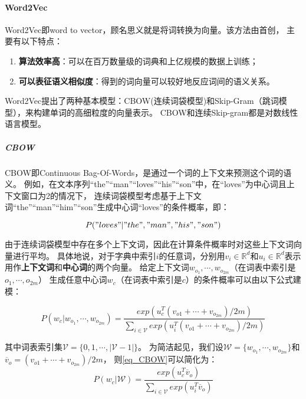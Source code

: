 \paragraph{Word2Vec}

Word2Vec即word to vector，顾名思义就是将词转换为向量。该方法由\parencite{mikolov2013efficient}首创，
主要有以下特点：
\begin{enumerate}
    \item \textbf{算法效率高}：可以在百万数量级的词典和上亿规模的数据上训练；
    \item \textbf{可以表征语义相似度}：得到的词向量可以较好地反应词间的语义关系。
\end{enumerate}

Word2Vec提出了两种基本模型：CBOW(连续词袋模型)和Skip-Gram（跳词模型），来构建单词的高细粒度的向量表示。
CBOW和连续Skip-gram都是对数线性语言模型。

\subparagraph{CBOW}
CBOW即Continuous Bag-Of-Words，是通过一个词的上下文来预测这个词的语义。
例如\parencite{zhang2021dive}，在文本序列“the”“man”“loves”“his”“son”中，在“loves”为中心词且上下文窗口为2的情况下，
连续词袋模型考虑基于上下文词“the”“man”“him”“son”生成中心词“loves”的条件概率，即：

\begin{equation}
    P("loves"|"the", "man", "his", "son")
\end{equation}

由于连续词袋模型中存在多个上下文词，因此在计算条件概率时对这些上下文词向量进行平均。
具体地说，对于字典中索引$i$的任意词，分别用$v_i \in \mathbb{R}^d$和$u_i \in \mathbb{R}^d$表示用作\textbf{上下文词}和\textbf{中心词}的两个向量。
给定上下文词$w_{o_1}, \cdots, w_{o_{2m}}$（在词表中索引是$o_1, \cdots, o_{2m}$）
生成任意中心词$w_c$（在词表中索引是$c$）的条件概率可以由以下公式建模：

\begin{equation}\label{eq_CBOW}
    P(w_c|w_{o_1}, \cdots, w_{o_{2m}})
    = \frac{exp \left(u^T_c(v_{o1} + \cdots + v_{o_{2m}}) / 2m \right)}
    {\sum_{i \in \mathcal{V}} exp \left( u^T_i(v_{o1} + \cdots + v_{o_{2m}}) / 2m \right)}
\end{equation}

其中词表索引集$\mathcal{V} = \{0, 1, \cdots, |\mathcal{V} - 1|\}$。
为简洁起见，我们设$\mathcal{W} = \{w_{o_1}, \cdots, w_{o_{2m}}\}$和$\overline{v}_o = (v_{o1} + \cdots + v_{o_{2m}}) / 2m $，
则\ref{eq_CBOW}可以简化为：
\begin{equation}
    P(w_c|\mathcal{W})
    = \frac{exp \left(u^T_c \overline{v}_o \right)}
    {\sum_{i \in \mathcal{V}} exp \left( u^T_i \overline{v}_o \right)}
\end{equation}

